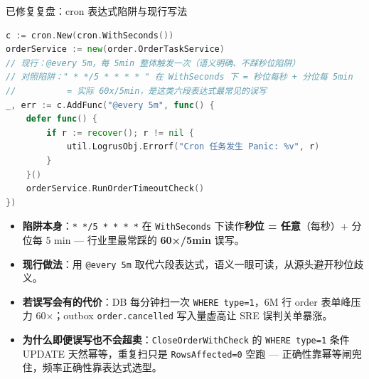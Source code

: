 \documentclass[aspectratio=169,11pt]{beamer}
\begin{document}
\begin{frame}{已修复复盘：cron 表达式陷阱与现行写法}
\begin{lstlisting}[language=Go,firstnumber=19,
  caption={initialize/cron.go:19--28 现行写法 @every 5m（左侧为陷阱对照）},captionpos=b]
c := cron.New(cron.WithSeconds())
orderService := new(order.OrderTaskService)
// 现行：@every 5m，每 5min 整体触发一次（语义明确、不踩秒位陷阱）
// 对照陷阱：" * */5 * * * * " 在 WithSeconds 下 = 秒位每秒 + 分位每 5min
//          = 实际 60x/5min，是这类六段表达式最常见的误写
_, err := c.AddFunc("@every 5m", func() {
    defer func() {
        if r := recover(); r != nil {
            util.LogrusObj.Errorf("Cron 任务发生 Panic: %v", r)
        }
    }()
    orderService.RunOrderTimeoutCheck()
})
\end{lstlisting}
\begin{itemize}
  \item \textbf{陷阱本身}：\texttt{* */5 * * * *} 在 \texttt{WithSeconds} 下读作\textbf{秒位 = 任意}（每秒）+ 分位每 5 min — 行业里最常踩的 \textbf{60×/5min} 误写。
  \item \textbf{现行做法}：用 \texttt{@every 5m} 取代六段表达式，语义一眼可读，从源头避开秒位歧义。
  \item \textbf{若误写会有的代价}：DB 每分钟扫一次 \texttt{WHERE type=1}，6M 行 order 表单峰压力 60×；outbox \texttt{order.cancelled} 写入量虚高让 SRE 误判关单暴涨。
  \item \textbf{为什么即便误写也不会超卖}：\texttt{CloseOrderWithCheck} 的 \texttt{WHERE type=1} 条件 UPDATE 天然幂等，重复扫只是 \texttt{RowsAffected=0} 空跑 — 正确性靠幂等闸兜住，频率正确性靠表达式选型。
\end{itemize}
\end{frame}
\end{document}
